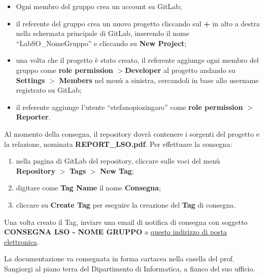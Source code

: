 %
\begin{tcolorbox}[colback=blue!20!white,colframe=blue!75!black,title=GitLab]
 \begin{itemize}
  \item Ogni membro del gruppo crea un account su GitLab;
  \item il referente del gruppo  crea un nuovo progetto cliccando sul \textbf{+} in alto a destra nella schermata principale di GitLab, inserendo il nome ``LabSO\_NomeGruppo'' e cliccando su \textbf{New Project};
  \item una volta che il progetto è stato creato, il referente aggiunge ogni membro del gruppo come \textbf{role permission} $>$\textbf{Developer} al progetto andando su \textbf{Settings} $>$ \textbf{Members} nel menù a sinistra, cercandoli in base allo username registrato su GitLab;
  \item il referente aggiunge l'utente ``stefanopiozingaro'' come \textbf{role permission} $>$ \textbf{Reporter}.
 \end{itemize}
\end{tcolorbox}
%
Al momento della consegna, il repository dovrà contenere i sorgenti del progetto e la relazione, nominata \textbf{REPORT\_LSO.pdf}. Per effettuare la consegna:
\begin{enumerate}
 \item nella pagina di GitLab del repository, cliccare sulle voci del menù \textbf{Repository} $>$ \textbf{Tags} $>$ \textbf{New Tag};
 \item digitare come \textbf{Tag Name} il nome \textbf{Consegna};
 \item cliccare su \textbf{Create Tag} per eseguire la creazione del \textbf{Tag} di consegna.
\end{enumerate}
%
Una volta creato il Tag, inviare una email di notifica di consegna con soggetto \textbf{CONSEGNA LSO - NOME GRUPPO} a \href{stefanopio.zingaro@unibo.it}{questo indirizzo di posta elettronica}.
\begin{tcolorbox}[colback=yellow!20!white,colframe=yellow!75!black,title=\textbf{N.B.}]
 La documentazione va consegnata in forma cartacea nella casella del prof. Sangiorgi al piano terra del Dipartimento di Informatica, a fianco del suo ufficio.
\end{tcolorbox}

